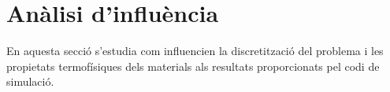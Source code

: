 
\setcounter{section}{3}

\section{Anàlisi d'influència}

En aquesta secció s'estudia com influencien la discretització del problema i les propietats termofísiques dels materials als resultats proporcionats pel codi de simulació.









